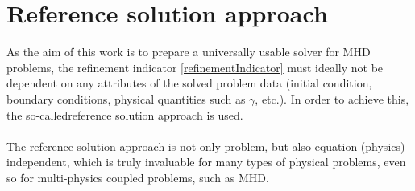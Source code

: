 \section{Reference solution approach}
As the aim of this work is to prepare a universally usable solver for MHD problems, the refinement indicator \cref{refinementIndicator} must ideally not be dependent on any attributes of the solved problem data (initial condition, boundary conditions, physical quantities such as $\gamma$, etc.). In order to achieve this, the so-called{reference solution} approach is used.
\paragraph{}
The reference solution approach is not only problem, but also equation (physics) independent, which is truly invaluable for many types of physical problems, even so for multi-physics coupled problems, such as MHD.
